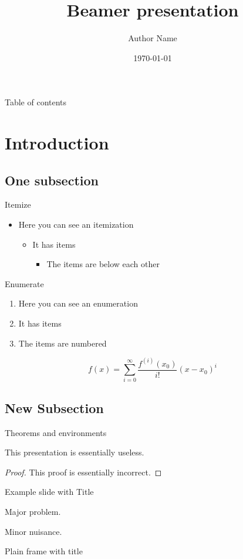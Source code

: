 \documentclass{beamer}
\author{Author Name}
\title{Beamer presentation}
\institute{Ecole polytechnique fédérale de Lausanne}
\date{\today}
\begin{document}
\frame{\maketitle}
\begin{frame}{Table of contents}
	\tableofcontents
\end{frame}

\section{Introduction}
\subsection{One subsection}
\begin{frame}{Itemize}
\begin{itemize}
\item Here you can see an itemization
\begin{itemize}
\item It has items
\begin{itemize}
\item The items are below each other
\end{itemize}
\end{itemize}
\end{itemize}
\end{frame}

\begin{frame}{Enumerate}
\begin{enumerate}
\item Here you can see an enumeration
\item It has items
\item The items are numbered
\end{enumerate}
\[
	f(x)=\sum_{i=0}^\infty \frac{f^{(i)}(x_0)}{i!}(x-x_0)^i
\]
\end{frame}

\subsection{New Subsection}
\begin{frame}{Theorems and environments}
\begin{theorem}
This presentation is essentially useless.
\end{theorem}
\begin{proof}
This proof is essentially incorrect.
\end{proof}
\end{frame}

\begin{frame}{Example slide with Title}
\begin{example}
Major problem.
\end{example}
\begin{solution}
Minor nuisance.
\end{solution}
\end{frame}

\begin{frame}[plain]{Plain frame with title}
\lipsum[1]
\end{frame}
\end{document}
